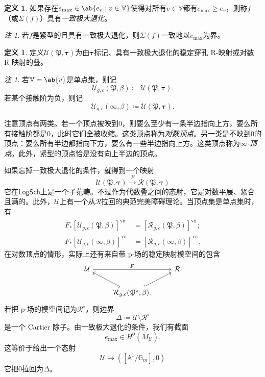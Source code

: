 \documentclass{amsart}
\theoremstyle{definition}
\newtheorem{defn}[thm]{定义}
\theoremstyle{remark}
\newtheorem{rmk}[thm]{注}
\theoremstyle{plain}
\theoremstyle{definition}
\theoremstyle{remark}
\newcommand{\A}{\mathbb{A}}
\newcommand{\G}{\mathbb{G}}
\newcommand{\V}{\mathbb{V}}
\newcommand{\mc}[1]{\mathcal{#1}}
\newcommand{\mf}[1]{\mathfrak{#1}}
\newcommand{\mr}[1]{\mathrm{#1}}
\newcommand{\ms}[1]{\mathsf{#1}}
\newcommand{\1}{\mathbf{1}}
\newcommand{\2}{\mathbf{2}}
\newcommand{\3}{\mathbf{3}}
\newcommand{\vir}{\mr{vir}}
\begin{document}
\begin{defn}
    如果存在\(e_{\max} \in \ab\{e_v \mid v \in \V \}\)使得对所有\(v \in \V\)都有\(e_{\max} \geq e_v\)，则称\(f\)（或\(\Sigma(f)\)）具有\textit{一致极大退化}。
\end{defn}

\begin{rmk}
    若\(f\)是紧型的且具有一致极大退化，则\(\Sigma(f)\)一致地以\(e_{\max}\)为界。
\end{rmk}

\begin{defn}
    定义\(\mc{U}(\mf{P}, \bm{\tau})\)为由\(\bm{\tau}\)标记、具有一致极大退化的稳定穿孔 R-映射或对数 R-映射的叠。
\end{defn}

\begin{rmk}
    若\(\V = \ab\{v\}\)是单点集，则记
    \[ \mc{U}_{g, c}(\mf{P}, \beta) \coloneqq \mc{U}(\mf{P}, \bm{\tau}). \]
    若某个接触阶为负，则记
    \[ \mc{U}_{g, c}(\infty, \beta) \coloneqq \mc{U}(\mf{P}, \bm{\tau}). \]
\end{rmk}

注意顶点有两类。若一个顶点被映到\(0\)，则要么至少有一条半边指向上方，要么所有接触阶都是\(0\)，此时它们全被收缩。这类顶点称为\textit{对数顶点}。另一类是不映到\(0\)的顶点：要么所有半边都指向下方，要么有一些半边指向上方。这类顶点称为\textit{\(\infty\)-顶点}。此外，紧型的顶点恰是没有向上半边的顶点。

如果忘掉一致极大退化的条件，就得到一个映射
\[ \mc{U}(\mf{P}, \bm{\tau}) \xrightarrow{F} \mc{R}(\mf{P}, \bm{\tau}) \]
它在\(\ms{LogSch}\)上是一个子范畴。不过作为代数叠之间的态射，它是对数平展、紧合且满的。此外，\(\mc{U}\)上有一个从\(\mc{R}\)拉回的典范完美障碍理论。当顶点集是单点集时，有
\begin{align*}
    F_* [\mc{U}_{g, c}(\mf{P}, \beta)]^{\vir} &= [\mc{R}_{g, c}(\mf{P}, \beta)]^{\vir}; \\
    F_* [\mc{U}_{g, c}(\infty, \beta)]^{\vir} &= [\mc{R}_{g, c}(\infty, \beta)]^{\vir}.
\end{align*}
在对数顶点的情形，实际上还有来自带 p-场的稳定映射模空间的包含
\begin{equation*}
\begin{tikzcd}
    \mc{U} \ar{rr}{F} & & \mc{R} \\
    & \mc{R}_{g,c}(\mf{P}^{\circ}, \beta) \ar[hookrightarrow]{ul} \ar[hookrightarrow]{ur}.
\end{tikzcd}
\end{equation*}
若把 p-场的模空间记为\(\mc{R}^{\circ}\)，则边界
\[ \Delta \coloneqq \mc{U} \setminus \mc{R}^{\circ} \]
是一个 Cartier 除子。由一致极大退化的条件，我们有截面
\[ e_{\max} \in H^0(\bar{M}_{\mc{U}}). \]
这等价于给出一个态射
\[ \mc{U} \to ([\A^1/\G_m], 0) \]
它把\(0\)拉回为\(\Delta\)。
\end{document}
